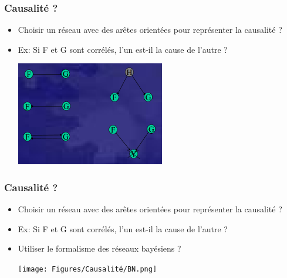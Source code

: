 \begin{frame}
    \frametitle{Causalité ?}
\begin{itemize}
    \item Choisir un réseau avec des arêtes orientées pour représenter la causalité ?
    \pause 
\item Ex: Si F et G sont corrélés, l'un est-il la cause de l'autre ?

	 \pause 
	    \begin{center}
	     \includegraphics[width=6.5cm]{Figures/Causalité/F_et_G_corrélés.png}
	     	   \end{center}



\end{itemize}
\end{frame}

\begin{frame}
    \frametitle{Causalité ?}
\begin{itemize}
    \item Choisir un réseau avec des arêtes orientées pour représenter la causalité ?

\item Ex: Si F et G sont corrélés, l'un est-il la cause de l'autre ?

    
    \item Utiliser le formalisme des réseaux bayésiens ? 
    
    \begin{center}
    \texttt{[image: Figures/Causalité/BN.png]}        
    \end{center}
    
\end{itemize}
\end{frame}




